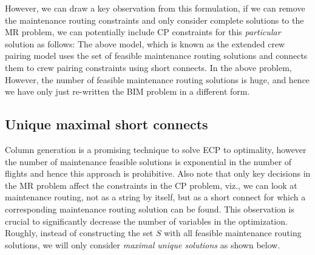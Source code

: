 \documentclass[letterpaper, 10pt, twocolumn, reqno]{amsart}
\begin{document}
However, we can draw a key observation from this formulation, if we can remove the maintenance routing constraints and only consider complete solutions to the MR problem, we can potentially include CP constraints for this \emph{particular} solution as follows:
The above model, which is known as the extended crew pairing model uses the set of feasible maintenance routing solutions and connects them to crew pairing constraints using short connects. In the above problem,
However, the number of feasible maintenance routing solutions is huge, and hence we have only just re-written the BIM problem in a different form.

\subsection{Unique maximal short connects}
\label{ssec:unique_maximal_sc}

Column generation is a promising technique to solve ECP to optimality, however the number of maintenance feasible solutions is exponential in the number of flights and hence this approach is prohibitive. Also note that only key decisions in the MR problem affect the constraints in the CP problem, viz., we can look at maintenance routing, not as a string by itself, but as a short connect for which a corresponding maintenance routing solution can be found. This observation is crucial to significantly decrease the number of variables in the optimization. Roughly, instead of constructing the set $S$ with all feasible maintenance routing solutions, we will only consider \emph{maximal unique solutions} as shown below.
\end{document}
